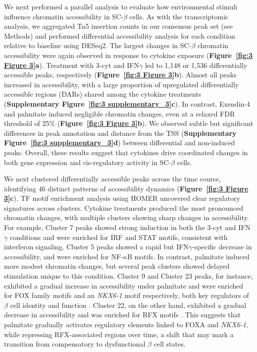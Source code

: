 We next performed a parallel analysis to evaluate how environmental stimuli influence chromatin accessibility in SC-$\beta$ cells. As with the transcriptomic analysis, we aggregated Tn5 insertion counts in our consensus peak set (see Methods) and performed differential accessibility analysis for each condition relative to baseline using DESeq2. The largest changes in SC-$\beta$ chromatin accessibility were again observed in response to cytokine exposure (\textbf{Figure~\ref{fig:3 Figure 3}\textbf{a}}). Treatment with 3-cyt and IFN$\gamma$ led to 1,148 or 1,536 differentially accessible peaks, respectively (\textbf{Figure~\ref{fig:3 Figure 3}\textbf{b}}). Almost all peaks increased in accessibility, with a large proportion of upregulated differentially accessible regions (DARs) shared among the cytokine treatments (\textbf{Supplementary Figure~\ref{fig:3 supplementary_3}\textbf{c}}). In contrast, Exendin-4 and palmitate induced negligible chromatin changes, even at a relaxed FDR threshold of 25\% (\textbf{Figure~\ref{fig:3 Figure 3}\textbf{b}}). We observed subtle but significant differences in peak annotation and distance from the TSS (\textbf{Supplementary Figure~\ref{fig:3 supplementary_3}\textbf{d}}) between differential and non-induced peaks. Overall, these results suggest that cytokines drive coordinated changes in both gene expression and cis-regulatory activity in SC-$\beta$ cells.

We next clustered differentially accessible peaks across the time course, identifying 46 distinct patterns of accessibility dynamics (\textbf{Figure~\ref{fig:3 Figure 3}\textbf{c}}). TF motif enrichment analysis using HOMER \cite{Heinz2010-yo} uncovered clear regulatory signatures across clusters. Cytokine treatments produced the most pronounced chromatin changes, with multiple clusters showing sharp changes in accessibility. For example, Cluster 7 peaks showed strong induction in both the 3-cyt and IFN$\gamma$ conditions and were enriched for IRF and STAT motifs, consistent with interferon signaling. Cluster 5 peaks showed a rapid but IFN$\gamma$-specific decrease in accessibility, and were enriched for NF-$\kappa$B motifs. In contrast, palmitate induced more modest chromatin changes, but several peak clusters showed delayed stimulation unique to this condition. Cluster 9 and Cluster 23 peaks, for instance, exhibited a gradual increase in accessibility under palmitate and were enriched for FOX family motifs and an \textit{NKX6-1} motif respectively, both key regulators of $\beta$ cell identity and function \cite{Geusz2021-mr,Lantz2004-mi,Aigha2020-uu}. Cluster 22, on the other hand, exhibited a gradual decrease in accessibility and was enriched for RFX motifs \cite{Piccand2014-bd}. This suggests that palmitate gradually activates regulatory elements linked to FOXA and \textit{NKX6-1}, while repressing RFX-associated regions over time, a shift that may mark a transition from compensatory to dysfunctional $\beta$ cell states.

